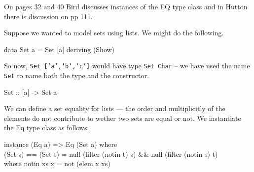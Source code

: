 \documentclass[11pt]{article}
\begin{document}


On pages 32 and 40 Bird discusses instances of the EQ type class and
in Hutton there is discussion on pp 111.

Suppose we wanted to model sets using lists.  We might do the
following.

\begin{program*}
\> data Set a = Set [a] deriving (Show) \\
\end{program*}

So now, {\tt{Set ['a','b','c']}} would have type {\tt{Set Char}} -- we
have used the name {\tt{Set}} to name both the type and the constructor.
\begin{program*}
\> Set :: [a] -> Set a \\
\end{program*}

We can define a set equality for lists --- the order and multiplicitly
of the elements do not contribute to wether two sets are equal or not.
We instantiate the Eq type class as follows:

\begin{program*}
\> instance (Eq a) =>  Eq (Set a) where \\
\>  (Set s) == (Set t) = null (filter (notin t) s) \&\& null (filter (notin s) t) \\
\>      where notin xs x  =  not (elem x xs) \\
\>  \\
\end{program*}

\end{document}
